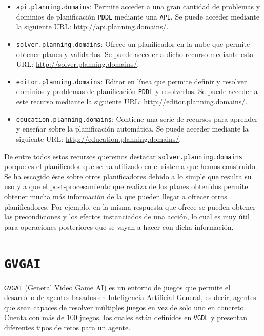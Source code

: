 \begin{itemize}[label=\textbullet]
    \item \texttt{api.planning.domains}: Permite acceder a una gran cantidad
    de problemas y dominios de planificación \texttt{PDDL} mediante una \texttt{API}.
    Se puede acceder mediante la siguiente URL: \url{http://api.planning.domains/}.
    \item \texttt{solver.planning.domains}: Ofrece un planificador en la nube que
    permite obtener planes y validarlos. Se puede acceder a dicho recurso mediante esta URL:
    \url{http://solver.planning.domains/}.
    \item \texttt{editor.planning.domains}: Editor en línea que permite definir
    y resolver dominios y problemas de planificación \texttt{PDDL} y resolverlos. Se puede
    acceder a este recurso mediante la siguiente URL: \url{http://editor.planning.domains/}.
    \item \texttt{education.planning.domains}: Contiene una serie de recursos para
    aprender y enseñar sobre la planificación automática. Se puede acceder mediante
    la siguiente URL: \url{http://education.planning.domains/}.
\end{itemize}

De entre todos estos recursos queremos destacar \texttt{solver.planning.domains} porque es el
planificador que se ha utilizado en el sistema que hemos construido. Se ha escogido éste sobre
otros planificadores debido a lo simple que resulta su uso y a que el post-procesamiento que realiza
de los planes obtenidos permite obtener mucha más información de la que pueden llegar a ofrecer
otros planificadores. Por ejemplo, en la misma respuesta que ofrece se pueden
obtener las precondiciones y los efectos instanciados de una acción, lo cual es muy útil para
operaciones posteriores que se vayan a hacer con dicha información.

\section{\texttt{GVGAI}}

\texttt{GVGAI} (General Video Game AI) \cite{7038214} es un entorno de juegos que permite
el desarrollo de agentes basados en Inteligencia Artificial General, es decir, agentes que sean
capaces de resolver múltiples juegos en vez de solo uno en concreto. Cuenta con más de 100 juegos,
los cuales están definidos en \texttt{VGDL} y presentan diferentes tipos de retos para un agente.

